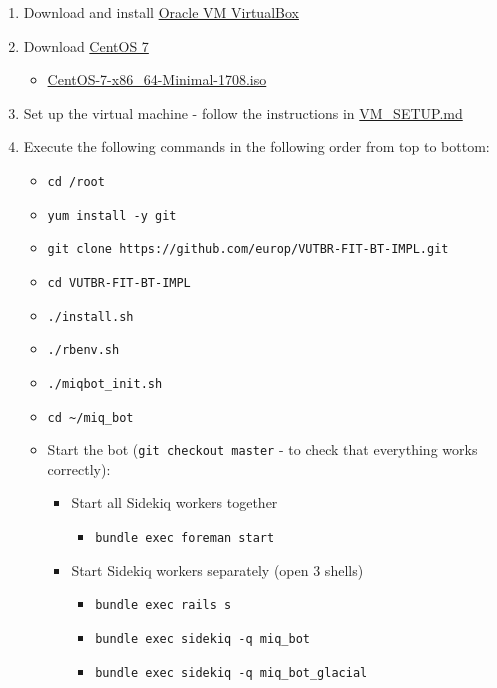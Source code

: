 \begin{enumerate}
\def\labelenumi{\arabic{enumi}.}
\tightlist
\item
  Download and install \href{https://www.virtualbox.org/}{Oracle VM
  VirtualBox}
\item
  Download \href{https://www.centos.org/}{CentOS 7}

  \begin{itemize}
  \tightlist
  \item
    \href{http://isoredirect.centos.org/centos/7/isos/x86_64/CentOS-7-x86_64-Minimal-1708.iso}{CentOS-7-x86\_64-Minimal-1708.iso}
  \end{itemize}
\item
  Set up the virtual machine - follow the instructions in
  \href{https://github.com/europ/VUTBR-FIT-BT-IMPL/blob/master/VM_SETUP.md}{VM\_SETUP.md}
\item
  Execute the following commands in the following order from top to
  bottom:

  \begin{itemize}
  \tightlist
  \item
    \texttt{cd\ /root}
  \item
    \texttt{yum\ install\ -y\ git}
  \item
    \texttt{git\ clone\ https://github.com/europ/VUTBR-FIT-BT-IMPL.git}
  \item
    \texttt{cd\ VUTBR-FIT-BT-IMPL}
  \item
    \texttt{./install.sh}
  \item
    \texttt{./rbenv.sh}
  \item
    \texttt{./miqbot\_init.sh}
  \item
    \texttt{cd\ \textasciitilde{}/miq\_bot}
  \item
    Start the bot (\texttt{git\ checkout\ master} - to check that
    everything works correctly):

    \begin{itemize}
    \tightlist
    \item
      Start all Sidekiq workers together

      \begin{itemize}
      \tightlist
      \item
        \texttt{bundle\ exec\ foreman\ start}
      \end{itemize}
    \item
      Start Sidekiq workers separately (open 3 shells)

      \begin{itemize}
      \tightlist
      \item
        \texttt{bundle\ exec\ rails\ s}
      \item
        \texttt{bundle\ exec\ sidekiq\ -q\ miq\_bot}
      \item
        \texttt{bundle\ exec\ sidekiq\ -q\ miq\_bot\_glacial}
      \end{itemize}
    \end{itemize}
  \end{itemize}
\end{enumerate}

